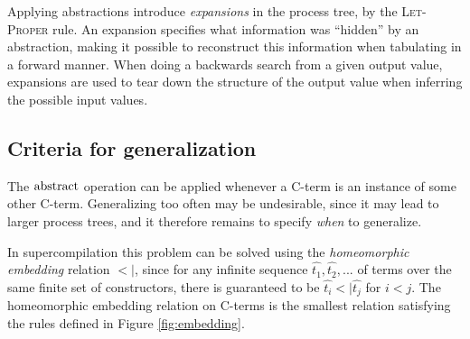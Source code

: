 \documentclass[10pt]{../sigplanconf}
\begin{document}
Applying abstractions introduce \emph{expansions} in the process tree,
by the \textsc{Let-Proper} rule. An expansion specifies what
information was ``hidden'' by an abstraction, making it possible to
reconstruct this information when tabulating in a forward manner. When
doing a backwards search from a given output value, expansions are
used to tear down the structure of the output value when inferring the
possible input values.

\subsection{Criteria for generalization}
The ${\rm abstract}$ operation can be applied whenever a C-term is an
instance of some other C-term. Generalizing too often may be
undesirable, since it may lead to larger process trees, and it
therefore remains to specify \emph{when} to generalize.

In supercompilation\cite{sorensen1998introduction} this problem can be
solved using the \emph{homeomorphic embedding} relation $<|$, since
for any infinite sequence $\widehat{t_1}, \widehat{t_2}, ...$ of terms
over the same finite set of constructors, there is guaranteed to be
$\widehat{t_i} <| \widehat{t_j}$ for $i < j$. The homeomorphic embedding relation on C-terms is the
smallest relation satisfying the rules defined in Figure
\ref{fig:embedding}.
\end{document}
